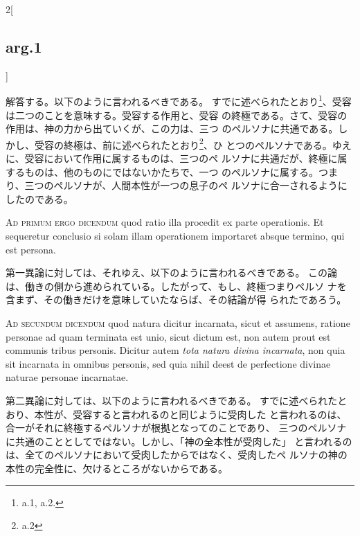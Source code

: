 \documentclass[paper=a4paper,fontsize=10pt,jafontsize=9pt,titlepage]{jlreq}
\begin{document}
\begin{paracol}{2}[\subsection{arg.1}]
\switchcolumn

解答する。以下のように言われるべきである。
すでに述べられたとおり\footnote{a.1, a.2.}、受容は二つのことを意味する。受容する作用と、受容
 の終極である。さて、受容の作用は、神の力から出ていくが、この力は、三つ
 のペルソナに共通である。しかし、受容の終極は、前に述べられたとおり\footnote{a.2}、ひ
 とつのペルソナである。ゆえに、受容において作用に属するものは、三つのペ
 ルソナに共通だが、終極に属するものは、他のものにではないかたちで、一つ
 のペルソナに属する。つまり、三つのペルソナが、人間本性が一つの息子のペ
 ルソナに合一されるようにしたのである。

\switchcolumn*[\subsection{ad.1}]

{\scshape Ad primum ergo dicendum} quod ratio illa procedit ex parte
operationis. Et sequeretur conclusio si solam illam operationem
importaret absque termino, qui est persona.

\switchcolumn

第一異論に対しては、それゆえ、以下のように言われるべきである。
この論は、働きの側から進められている。したがって、もし、終極つまりペルソ
 ナを含まず、その働きだけを意味していたならば、その結論が得
 られたであろう。

\switchcolumn*[\subsection{ad.2}]

{\scshape Ad secundum dicendum} quod natura dicitur incarnata, sicut et assumens,
ratione personae ad quam terminata est unio, sicut dictum est, non autem
prout est communis tribus personis. Dicitur autem {\itshape tota natura divina
incarnata}, non quia sit incarnata in omnibus personis, sed quia nihil
deest de perfectione divinae naturae personae incarnatae.

\switchcolumn

第二異論に対しては、以下のように言われるべきである。
すでに述べられたとおり、本性が、受容すると言われるのと同じように受肉した
 と言われるのは、合一がそれに終極するペルソナが根拠となってのことであり、
 三つのペルソナに共通のこととしてではない。しかし、「神の全本性が受肉した」
 と言われるのは、全てのペルソナにおいて受肉したからではなく、受肉したペ
 ルソナの神の本性の完全性に、欠けるところがないからである。

\switchcolumn*[\subsection{ad.3}]


\end{paracol}
\end{document}
